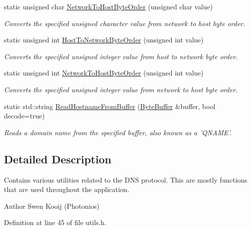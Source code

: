 \begin{DoxyCompactItemize}
static unsigned char \hyperlink{class_senergy_1_1_dns_1_1_utils_ac34288e7acfa54f6faaa775ab5654192}{Network\-To\-Host\-Byte\-Order} (unsigned char value)
\begin{DoxyCompactList}\small\item\em Converts the specified unsigned character value from network to host byte order. \end{DoxyCompactList}\item 
static unsigned int \hyperlink{class_senergy_1_1_dns_1_1_utils_a7a521aadbb12776e2127abe8028411dc}{Host\-To\-Network\-Byte\-Order} (unsigned int value)
\begin{DoxyCompactList}\small\item\em Converts the specified unsigned integer value from host to network byte order. \end{DoxyCompactList}\item 
static unsigned int \hyperlink{class_senergy_1_1_dns_1_1_utils_ad4711275abcbc1d332f3c0208e74c4b8}{Network\-To\-Host\-Byte\-Order} (unsigned int value)
\begin{DoxyCompactList}\small\item\em Converts the specified unsigned integer value from network to host byte order. \end{DoxyCompactList}\item 
static std\-::string \hyperlink{class_senergy_1_1_dns_1_1_utils_a81879edd7a9daec1d6dfbf952549c500}{Read\-Hostname\-From\-Buffer} (\hyperlink{class_senergy_1_1_byte_buffer}{Byte\-Buffer} \&buffer, bool decode=true)
\begin{DoxyCompactList}\small\item\em Reads a domain name from the specified buffer, also known as a 'Q\-N\-A\-M\-E'. \end{DoxyCompactList}\end{DoxyCompactItemize}


\subsection{Detailed Description}
Contains various utilities related to the D\-N\-S protocol. This are mostly functions that are used throughout the application. 

\begin{DoxyAuthor}{Author}
Swen Kooij (Photonios) 
\end{DoxyAuthor}


Definition at line 45 of file utils.\-h.



